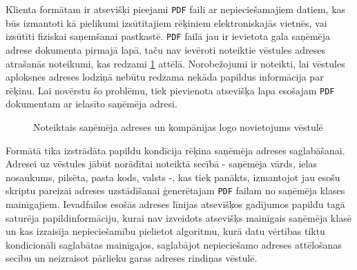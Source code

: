 \par Klienta formātam ir atsevišķi pieejami \texttt{PDF} faili ar nepieciešamajiem datiem, kas būs izmantoti kā pielikumi izsūtītajiem rēķiniem elektroniskajās vietnēs, vai izsūtīti fiziskai saņemšanai pastkastē. \texttt{PDF} failā jau ir ievietota gala saņēmēja adrese dokumenta pirmajā lapā, taču nav ievēroti noteiktie vēstules adreses atrašanās noteikumi, kas redzami \ref{orig:margins} attēlā. Norobežojumi ir noteikti, lai vēstules aploksnes adreses lodziņā nebūtu redzama nekāda papildus informācija par rēķinu. Lai novērstu šo problēmu, tiek pievienota atsevišķa lapa esošajam \texttt{PDF} dokumentam ar ielasīto saņēmēja adresi.
\begin{figure}[H]
    \centering
    \caption{Noteiktais saņēmēja adreses un kompānijas logo novietojums vēstulē}
    \label{orig:margins}
\end{figure}
\par Formātā tika izstrādāta papildu kondīcija rēķina saņēmēja adreses saglabāšanai. Adresei uz vēstules jābūt norādītai noteiktā secībā - saņēmēja vārds, ielas nosaukums, pilsēta, pasta kods, valsts -, kas tiek panākts, izmantojot jau esošu skriptu pareizai adreses uzstādīšanai ģenerētajam \texttt{PDF} failam no saņēmēja klases mainīgajiem. Ievadfailos esošās adreses līnijas atsevišķos gadījumos papildu tagā saturēja papildinformāciju, kurai nav izveidots atsevišķs mainīgais saņēmēja klasē un kas izraisīja nepieciešamību pielietot algoritmu, kurā datu vērtības tiktu kondicionāli saglabātas mainīgajos, saglabājot nepieciešamo adreses attēlošanas secību un neizraisot pārlieku garas adreses rindiņas vēstulē.

